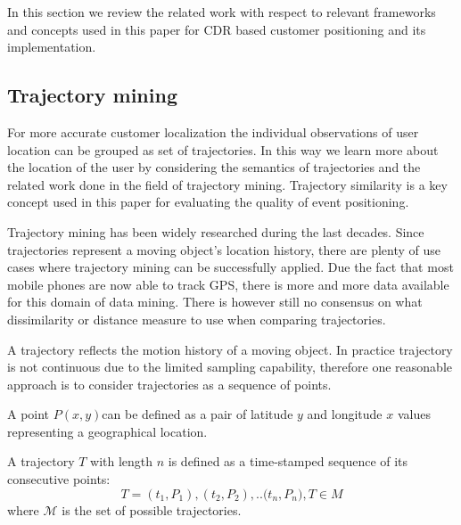 In this section we review the related work with respect to relevant frameworks and concepts used in this paper for CDR based customer positioning and its implementation.

\subsection{Trajectory mining}
For more accurate customer localization the individual observations of user location can be grouped as set of trajectories. In this way we learn more about the location of the user by considering the semantics of trajectories and the related work done in the field of trajectory mining. Trajectory similarity is a key concept used in this paper for evaluating the quality of event positioning.

Trajectory mining has been widely researched during the last decades. Since trajectories represent a moving object's location history, there are plenty of use cases where trajectory mining can be successfully applied.  Due the fact that most mobile phones are now able to track GPS, there is more and more data available for this domain of data mining. There is however still no consensus on what dissimilarity or distance measure to use when comparing trajectories.

A trajectory reflects the motion history of a moving object. In practice trajectory is not continuous due to the limited sampling capability, therefore one reasonable approach is to consider trajectories as a sequence of points.

\begin{definition}
A point $P(x,y)$can be defined as a pair of latitude $y$ and longitude $x$ values representing a geographical location.
\end{definition}

\begin{definition}
A trajectory $T$ with length $n$ is defined as a time-stamped sequence of its consecutive points: \[T={(t_{1},P_{1}), (t_{2},P_{2}), .. (t_{n},P_{n}}), T \in M\]
where $\mathcal{M}$ is the set of possible trajectories.
\end{definition}

